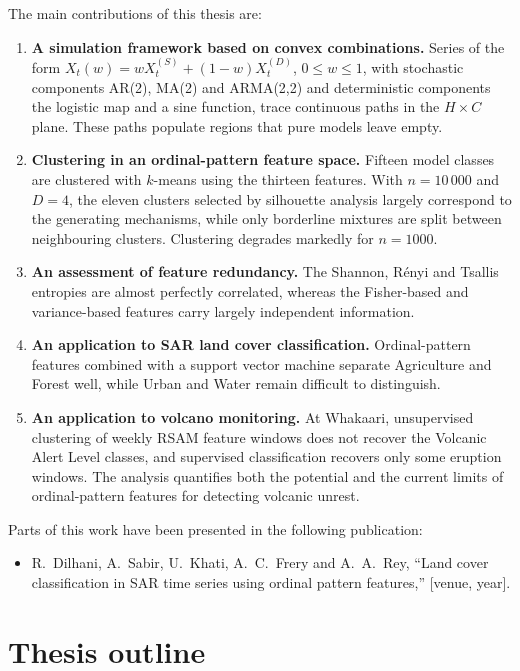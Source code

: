 The main contributions of this thesis are:
\begin{enumerate}
	\item \textbf{A simulation framework based on convex combinations.} Series of the form $X_t(w)=wX_t^{(S)}+(1-w)X_t^{(D)}$, $0\le w\le 1$, with stochastic components AR(2), MA(2) and ARMA(2,2) and deterministic components the logistic map and a sine function, trace continuous paths in the $H\times C$ plane. These paths populate regions that pure models leave empty.
	\item \textbf{Clustering in an ordinal-pattern feature space.} Fifteen model classes are clustered with $k$-means using the thirteen features. With $n=10\,000$ and $D=4$, the eleven clusters selected by silhouette analysis largely correspond to the generating mechanisms, while only borderline mixtures are split between neighbouring clusters. Clustering degrades markedly for $n=1000$.
	\item \textbf{An assessment of feature redundancy.} The Shannon, R\'enyi and Tsallis entropies are almost perfectly correlated, whereas the Fisher-based and variance-based features carry largely independent information.
	\item \textbf{An application to SAR land cover classification.} Ordinal-pattern features combined with a support vector machine separate Agriculture and Forest well, while Urban and Water remain difficult to distinguish.
	\item \textbf{An application to volcano monitoring.} At Whakaari, unsupervised clustering of weekly RSAM feature windows does not recover the Volcanic Alert Level classes, and supervised classification recovers only some eruption windows. The analysis quantifies both the potential and the current limits of ordinal-pattern features for detecting volcanic unrest.
\end{enumerate}

Parts of this work have been presented in the following publication:
\begin{itemize}
	\item R.~Dilhani, A.~Sabir, U.~Khati, A.~C.~Frery and A.~A.~Rey, ``Land cover classification in SAR time series using ordinal pattern features,'' [venue, year].
\end{itemize}

\section{Thesis outline}\label{S:intro:outline}

